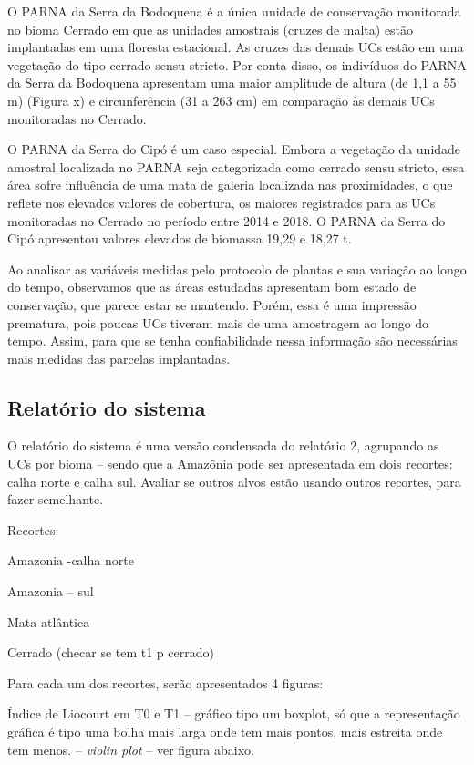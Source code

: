 \documentclass[
  letterpaper,
]{scrbook}
\begin{document}
O PARNA da Serra da Bodoquena é a única unidade de conservação
monitorada no bioma Cerrado em que as unidades amostrais (cruzes de
malta) estão implantadas em uma floresta estacional. As cruzes das
demais UCs estão em uma vegetação do tipo cerrado sensu stricto. Por
conta disso, os indivíduos do PARNA da Serra da Bodoquena apresentam uma
maior amplitude de altura (de 1,1 a 55 m) (Figura x) e circunferência
(31 a 263 cm) em comparação às demais UCs monitoradas no Cerrado.

O PARNA da Serra do Cipó é um caso especial. Embora a vegetação da
unidade amostral localizada no PARNA seja categorizada como cerrado
sensu stricto, essa área sofre influência de uma mata de galeria
localizada nas proximidades, o que reflete nos elevados valores de
cobertura, os maiores registrados para as UCs monitoradas no Cerrado no
período entre 2014 e 2018. O PARNA da Serra do Cipó apresentou valores
elevados de biomassa 19,29 e 18,27 t.

Ao analisar as variáveis medidas pelo protocolo de plantas e sua
variação ao longo do tempo, observamos que as áreas estudadas apresentam
bom estado de conservação, que parece estar se mantendo. Porém, essa é
uma impressão prematura, pois poucas UCs tiveram mais de uma amostragem
ao longo do tempo. Assim, para que se tenha confiabilidade nessa
informação são necessárias mais medidas das parcelas implantadas.

\subsection{Relatório do sistema}\label{relatuxf3rio-do-sistema}

O relatório do sistema é uma versão condensada do relatório 2, agrupando
as UCs por bioma -- sendo que a Amazônia pode ser apresentada em dois
recortes: calha norte e calha sul. Avaliar se outros alvos estão usando
outros recortes, para fazer semelhante.

Recortes:

Amazonia -calha norte

Amazonia -- sul

Mata atlântica

Cerrado (checar se tem t1 p cerrado)

Para cada um dos recortes, serão apresentados 4 figuras:

Índice de Liocourt em T0 e T1 -- gráfico tipo um boxplot, só que a
representação gráfica é tipo uma bolha mais larga onde tem mais pontos,
mais estreita onde tem menos. -- \emph{violin plot} -- ver figura
abaixo.
\end{document}
